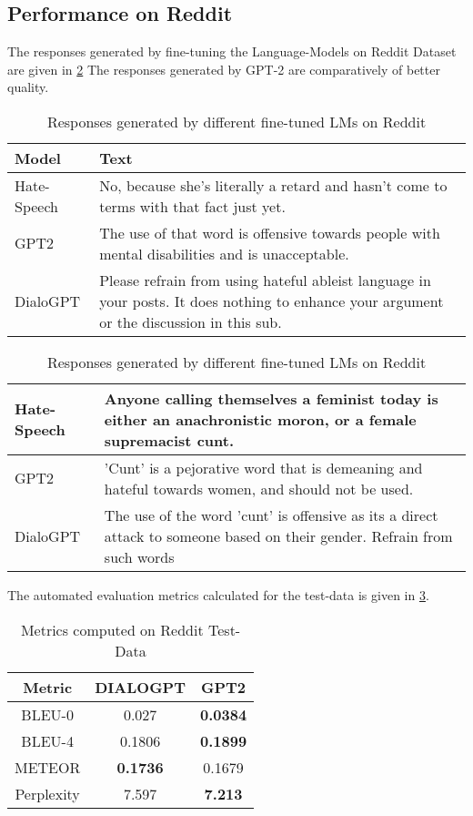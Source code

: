 \subsection{Performance on Reddit}
\par The responses generated by fine-tuning the Language-Models on Reddit Dataset are given in \ref{example-4} The responses generated by GPT-2 are comparatively of better quality.
\begin{table}[h]
\begin{tabular}{ |p{3cm}||p{12cm}|  }
 \hline
 \textbf{Model} & \textbf{Text}\\
 \hline
 Hate-Speech   &  No, because she's literally a retard and hasn't come to terms with that fact just yet.   \\
 \hline
 GPT2 & The use of that word is offensive towards people with mental disabilities and is unacceptable.\\
 \hline 
 DialoGPT & Please refrain from using hateful ableist language in your posts.  It does nothing to enhance your argument or the discussion in this sub.\\
 \hline
\end{tabular}
\begin{tabular}{ |p{3cm}||p{12cm}|  }
 \hline
 \hline
 Hate-Speech   &   Anyone calling themselves a feminist today is either an anachronistic moron, or a female supremacist cunt. \\
 \hline
 GPT2 & 'Cunt' is a pejorative word that is demeaning and hateful towards women, and should not be used.\\
 \hline 
 DialoGPT & The use of the word 'cunt' is offensive as its a direct attack to someone based on their gender. Refrain from such words\\
 \hline
\end{tabular}
\caption{Responses generated by different fine-tuned LMs on Reddit}
\label{example-4}
\end{table}
\newpage
\par The automated evaluation metrics calculated for the test-data is given in \ref{example-3}.

\begin{table}[h]
\centering
\begin{tabular}{ |c||c|c|}
 \hline
 \textbf{Metric} & \textbf{DIALOGPT} & \textbf{GPT2} \\
 \hline
  BLEU-0 &  0.027 &  \textbf{0.0384}\\
 \hline
  BLEU-4 & 0.1806 & \textbf{0.1899} \\
 \hline 
  METEOR & \textbf{0.1736} & 0.1679 \\
 \hline 
  Perplexity & 7.597 & \textbf{7.213}\\
  \hline
\end{tabular}
\caption{Metrics computed on Reddit Test-Data}
\label{example-3}
\end{table}


